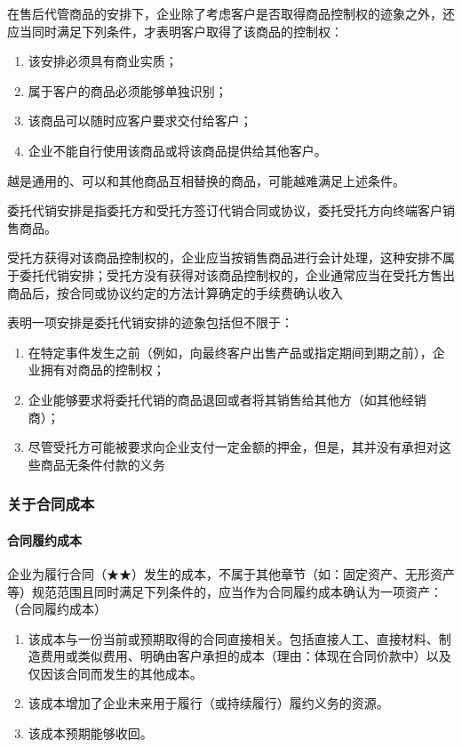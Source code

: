 \documentclass[UTF8,12pt]{ctexart}
\numberwithin{equation}{section} %
\numberwithin{figure}{section}
\numberwithin{table}{section}
\begin{document}
	在售后代管商品的安排下，企业除了考虑客户是否取得商品控制权的迹象之外，还应当同时满足下列条件，才表明客户取得了该商品的控制权：
	\begin{enumerate}
		\item 该安排必须具有商业实质；
		
		\item 属于客户的商品必须能够单独识别；
		
		\item 该商品可以随时应客户要求交付给客户；
		
		\item 企业不能自行使用该商品或将该商品提供给其他客户。
	\end{enumerate}
	越是通用的、可以和其他商品互相替换的商品，可能越难满足上述条件。
	
	委托代销安排是指委托方和受托方签订代销合同或协议，委托受托方向终端客户销售商品。
	
	受托方获得对该商品控制权的，企业应当按销售商品进行会计处理，这种安排不属于委托代销安排；受托方没有获得对该商品控制权的，企业通常应当在受托方售出商品后，按合同或协议约定的方法计算确定的手续费确认收入
	
	表明一项安排是委托代销安排的迹象包括但不限于：
	\begin{enumerate}
		\item 在特定事件发生之前（例如，向最终客户出售产品或指定期间到期之前），企业拥有对商品的控制权；
		
		\item 企业能够要求将委托代销的商品退回或者将其销售给其他方（如其他经销商）；
		
		\item 尽管受托方可能被要求向企业支付一定金额的押金，但是，其并没有承担对这些商品无条件付款的义务
	\end{enumerate}

	
	
	
	\subsubsection{关于合同成本}
	\paragraph{合同履约成本}
	企业为履行合同（★★）发生的成本，不属于其他章节（如：固定资产、无形资产等）规范范围且同时满足下列条件的，应当作为合同履约成本确认为一项资产：（合同履约成本）
	\begin{enumerate}
		\item 该成本与一份当前或预期取得的合同直接相关。包括直接人工、直接材料、制造费用或类似费用、明确由客户承担的成本（理由：体现在合同价款中）以及仅因该合同而发生的其他成本。
		
		\item 该成本增加了企业未来用于履行（或持续履行）履约义务的资源。
		
		\item 该成本预期能够收回。
	\end{enumerate}
\end{document}
